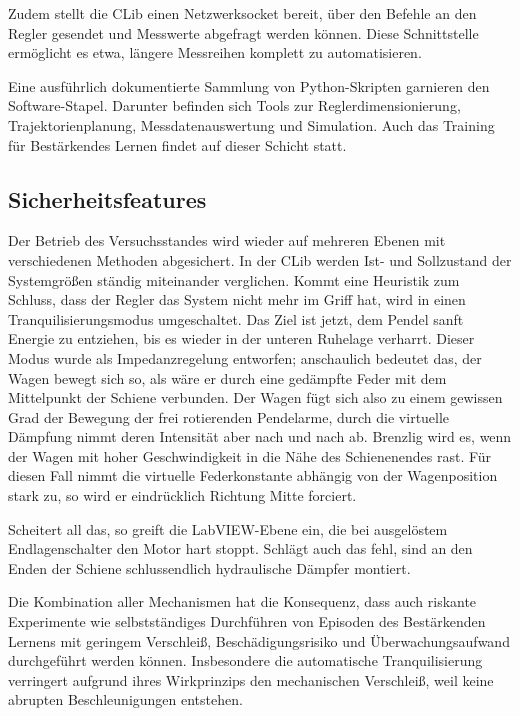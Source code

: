 \documentclass[a4paper,10pt]{scrartcl}
\begin{document}
Zudem stellt die CLib einen Netzwerksocket bereit, über den Befehle an den Regler gesendet und Messwerte abgefragt werden können. Diese Schnittstelle ermöglicht es etwa, längere Messreihen komplett zu automatisieren.

Eine ausführlich dokumentierte Sammlung von Python-Skripten garnieren den Software-Stapel. Darunter befinden sich Tools zur Reglerdimensionierung, Trajektorienplanung, Messdatenauswertung und Simulation. Auch das Training für Bestärkendes Lernen findet auf dieser Schicht statt.


\subsection{Sicherheitsfeatures}

Der Betrieb des Versuchsstandes wird wieder auf mehreren Ebenen mit verschiedenen Methoden abgesichert. In der CLib werden Ist- und Sollzustand der Systemgrößen ständig miteinander verglichen. Kommt eine Heuristik zum Schluss, dass der Regler das System nicht mehr im Griff hat, wird in einen Tranquilisierungsmodus umgeschaltet. Das Ziel ist jetzt, dem Pendel sanft Energie zu entziehen, bis es wieder in der unteren Ruhelage verharrt. Dieser Modus wurde als Impedanzregelung entworfen; anschaulich bedeutet das, der Wagen bewegt sich so, als wäre er durch eine gedämpfte Feder mit dem Mittelpunkt der Schiene verbunden. Der Wagen fügt sich also zu einem gewissen Grad der Bewegung der frei rotierenden Pendelarme, durch die virtuelle Dämpfung nimmt deren Intensität aber nach und nach ab. Brenzlig wird es, wenn der Wagen mit hoher Geschwindigkeit in die Nähe des Schienenendes rast. Für diesen Fall nimmt die virtuelle Federkonstante abhängig von der Wagenposition stark zu, so wird er eindrücklich Richtung Mitte forciert.

Scheitert all das, so greift die LabVIEW-Ebene ein, die bei ausgelöstem Endlagenschalter den Motor hart stoppt. Schlägt auch das fehl, sind an den Enden der Schiene schlussendlich hydraulische Dämpfer montiert.

Die Kombination aller Mechanismen hat die Konsequenz, dass auch riskante Experimente wie selbstständiges Durchführen von Episoden des Bestärkenden Lernens mit geringem Verschleiß, Beschädigungsrisiko und Überwachungsaufwand durchgeführt werden können. Insbesondere die automatische Tranquilisierung verringert aufgrund ihres Wirkprinzips den mechanischen Verschleiß, weil keine abrupten Beschleunigungen entstehen.
\end{document}
